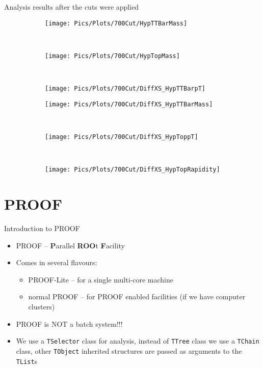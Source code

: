 \documentclass{beamer}
\begin{document}
\begin{frame}[t]{Analysis results after the cuts were applied}
	\begin{figure}[H]
		\centering
		\begin{subfigure}[b]{0.30\textwidth}
			\centering
			\texttt{[image: Pics/Plots/700Cut/HypTTBarMass]}
		\end{subfigure}~
		\begin{subfigure}[b]{0.30\textwidth}
			\centering
			\texttt{[image: Pics/Plots/700Cut/HypTopMass]}
		\end{subfigure}~
		\begin{subfigure}[b]{0.30\textwidth}
			\centering
			\texttt{[image: Pics/Plots/700Cut/DiffXS\_HypTTBarpT]}
		\end{subfigure}
		\begin{subfigure}[b]{0.30\textwidth}
			\centering
			\texttt{[image: Pics/Plots/700Cut/DiffXS\_HypTTBarMass]}
		\end{subfigure}~
		\begin{subfigure}[b]{0.30\textwidth}
			\centering
			\texttt{[image: Pics/Plots/700Cut/DiffXS\_HypToppT]}
		\end{subfigure}~
		\begin{subfigure}[b]{0.30\textwidth}
			\centering
			\texttt{[image: Pics/Plots/700Cut/DiffXS\_HypTopRapidity]}
		\end{subfigure}
	\end{figure}
\end{frame}


\section{PROOF}
\begin{frame}[t]{Introduction to PROOF}
	\begin{itemize}
		\item{PROOF -- {\bf P}arallel {\bf ROO}t {\bf F}acility}
		\item{Comes in several flavours:}
			\begin{itemize}
				\item{PROOF-Lite -- for a single multi-core machine}
				\item{normal PROOF -- for PROOF enabled facilities (if we have
					computer clusters)}
			\end{itemize}
		\item{PROOF is NOT a batch system!!!}
		\item{We use a {\tt TSelector} class for analysis, instead of {\tt TTree} class we use
			a {\tt TChain} class, other {\tt TObject} inherited structures are passed as
			arguments to the {\tt TList}s}
	\end{itemize}
\end{frame}
\end{document}
